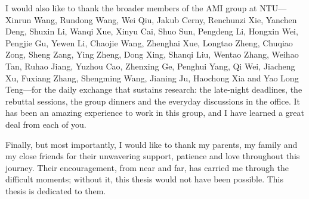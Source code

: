 \documentclass[12pt,a4paper]{Thesis} %
\begin{document}
{I would also like to thank the broader members of the AMI group at NTU---Xinrun Wang, Rundong Wang, Wei Qiu, Jakub Cerny, Renchunzi Xie, Yanchen Deng, Shuxin Li, Wanqi Xue, Xinyu Cai, Shuo Sun, Pengdeng Li, Hongxin Wei, Pengjie Gu, Yewen Li, Chaojie Wang, Zhenghai Xue, Longtao Zheng, Chuqiao Zong, Sheng Zang, Ying Zheng, Dong Xing, Shanqi Liu, Wentao Zhang, Weihao Tan, Ruhao Jiang, Yuzhou Cao, Zhenxing Ge, Penghui Yang, Qi Wei, Jiacheng Xu, Fuxiang Zhang, Shengming Wang, Jianing Ju, Haochong Xia and Yao Long Teng---for the daily exchange that sustains research: the late-night deadlines, the rebuttal sessions, the group dinners and the everyday discussions in the office. It has been an amazing experience to work in this group, and I have learned a great deal from each of you.

Finally, but most importantly, I would like to thank my parents, my family and my close friends for their unwavering support, patience and love throughout this journey. Their encouragement, from near and far, has carried me through the difficult moments; without it, this thesis would not have been possible. This thesis is dedicated to them.

}


\pagestyle{fancy} %
\fancyhead{}   %
\fancyhead[LO]{\sl{\leftmark}}
\fancyhead[RE]{\sl{\rightmark}}
\fancyhead[LE,RO]{\thepage}


\pagestyle{fancy} %

\tableofcontents %

\end{document}
